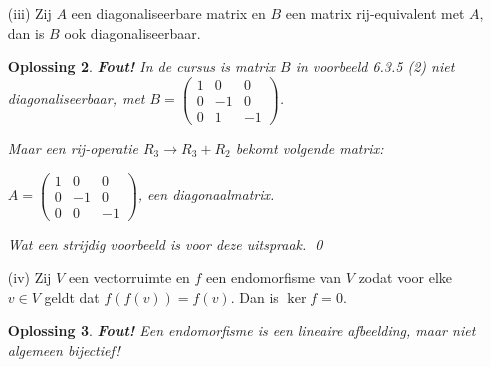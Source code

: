 \documentclass[a4paper,12pt]{article}
\newtheorem{oplossing}{Oplossing}
\begin{document}
\begin{enumerate}
\begin{itemize}
\begin{oplossing}
        Vb:
        \(A = \begin{pmatrix}
            1 & 0 \\
            0 & 5
        \end{pmatrix}
        \)
        en
        \(B = \begin{pmatrix}
            2 & 0 \\
            0 & 3
        \end{pmatrix}
        \)
        Overduidelijk is:
        \(\lambda_{A,1} = 1, \lambda_{A,2} = 5 \) en \(\lambda_{B,1} = 2, \lambda_{B,2} = 3\).

        Nu is
        \(AB = \begin{pmatrix}
            2 & 0 \\
            0 & 15
        \end{pmatrix}
        \)
        met
        \(\lambda_{AB,1} = 2, \lambda_{AB,2} = 15\).

        Het is duidelijk dat \(\lambda_{A,1}\lambda_{B,2} = 5 \notin \lambda_{AB}\).\qed
    \end{oplossing}
    \item[(iii)] Zij $A$ een diagonaliseerbare matrix en $B$ een matrix rij-equivalent met $A$, dan is $B$ ook diagonaliseerbaar.
    \begin{oplossing}
        \textbf{Fout!}
        In de cursus is matrix \(B\) in voorbeeld 6.3.5 (2) niet diagonaliseerbaar, met
        \(B = \begin{pmatrix}
            1 & 0 & 0 \\
            0 & -1 & 0\\
            0 & 1 & -1
        \end{pmatrix}\).

        Maar een rij-operatie \(R_3 \to R_3 + R_2\) bekomt volgende matrix:

        \(A = \begin{pmatrix}
            1 & 0 & 0 \\
            0 & -1 & 0\\
            0 & 0 & -1
        \end{pmatrix}\),
        een diagonaalmatrix.

        Wat een strijdig voorbeeld is voor deze uitspraak. \qed
    \end{oplossing}
    \item[(iv)] Zij $V$ een vectorruimte en $f$ een endomorfisme van $V$ zodat voor elke $v \in V$ geldt dat $f(f(v)) = f(v)$. Dan is $\ker f = 0$.
    \begin{oplossing}
        \textbf{Fout!} Een endomorfisme is een lineaire afbeelding, maar niet algemeen bijectief!


\end{oplossing}
\end{itemize}
\end{enumerate}
\end{document}
